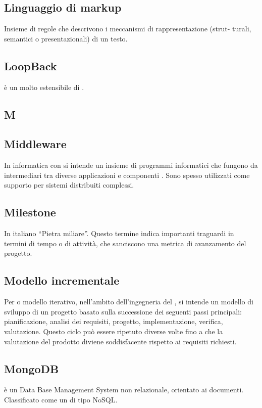 \subsection{Linguaggio di markup}
Insieme di regole che descrivono i meccanismi di rappresentazione (strut-
turali, semantici o presentazionali) di un testo.

\subsection{LoopBack}
 è un   molto estensibile di . 

\newpage

\begin{center}
\Huge\section{\uppercase{M}}
\end{center}

\subsection{Middleware}
In informatica con  si intende un insieme di programmi informatici che fungono da intermediari tra diverse applicazioni e componenti . Sono spesso utilizzati come supporto per sistemi distribuiti complessi.

\subsection{Milestone}
In italiano “Pietra miliare”. Questo termine indica importanti traguardi in termini di
tempo o di attività, che sanciscono una metrica di avanzamento del progetto.

\subsection{Modello incrementale}
Per  o modello iterativo, nell'ambito dell'ingegneria
del , si intende un modello di sviluppo di un progetto  basato sulla successione
dei seguenti passi principali: pianificazione, analisi dei requisiti, progetto, implementazione,
verifica, valutazione. Questo ciclo può essere ripetuto diverse volte fino a che la valutazione
del prodotto diviene soddisfacente rispetto ai requisiti richiesti.

\subsection{MongoDB}
 è un Data Base Management System non relazionale, orientato ai documenti. Classificato come un  di tipo NoSQL.

